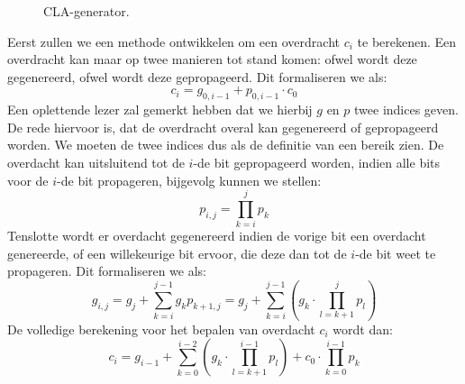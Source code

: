 \begin{figure}[hbt]
{
\label{fig:CLAGeneratorCascade}}
\caption{CLA-generator.}
\label{fig:CLAGenerator}
\end{figure}
Eerst zullen we een methode ontwikkelen om een overdracht $c_i$ te berekenen. Een overdracht kan maar op twee manieren tot stand komen: ofwel wordt deze gegenereerd, ofwel wordt deze gepropageerd. Dit formaliseren we als:
\begin{equation}
c_i=g_{0,i-1}+p_{0,i-1}\cdot c_0
\end{equation}
Een oplettende lezer zal gemerkt hebben dat we hierbij $g$ en $p$ twee indices geven. De rede hiervoor is, dat de overdracht overal kan gegenereerd of gepropageerd worden. We moeten de twee indices dus als de definitie van een bereik zien. De overdacht kan uitsluitend tot de $i$-de bit gepropageerd worden, indien alle bits voor de $i$-de bit propageren, bijgevolg kunnen we stellen:
\begin{equation}
p_{i,j}=\displaystyle\prod_{k=i}^j{p_k}
\end{equation}
Tenslotte wordt er overdacht gegenereerd indien de vorige bit een overdacht genereerde, of een willekeurige bit ervoor, die deze dan tot de $i$-de bit weet te propageren. Dit formaliseren we als:
\begin{equation}
g_{i,j}=g_j+\displaystyle\sum_{k=i}^{j-1}{g_kp_{k+1,j}}=g_j+\displaystyle\sum_{k=i}^{j-1}{\left(g_k\cdot\displaystyle\prod_{l=k+1}^j{p_l}\right)}
\end{equation}
De volledige berekening voor het bepalen van overdacht $c_i$ wordt dan:
\begin{equation}
c_i=g_{i-1}+\displaystyle\sum_{k=0}^{i-2}{\left(g_k\cdot\displaystyle\prod_{l=k+1}^{i-1}{p_l}\right)}+c_0\cdot\displaystyle\prod_{k=0}^{i-1}{p_k}
\end{equation}
